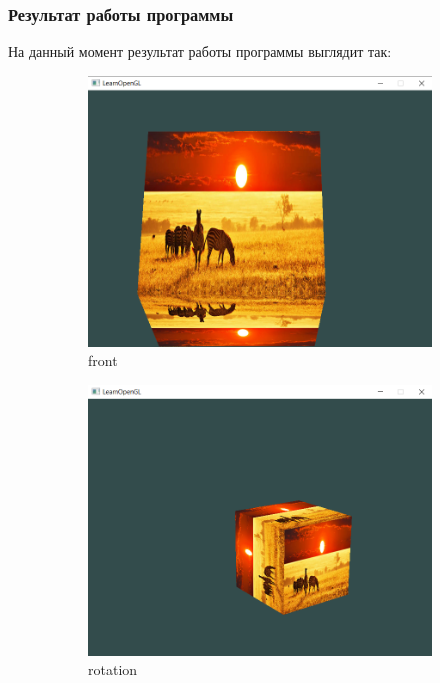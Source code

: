\documentclass[12pt]{article}
\newcounter{subsubsubsection}[subsubsection]
\begin{document}
  \subsubsection{Результат работы программы}
  На данный момент результат работы программы выглядит так:
  \begin{figure}[h]
    \begin{subfigure}{.5\textwidth}
      \centering
      \includegraphics[width=.8\linewidth]{images/res_proj2.png}
      \caption{front}
      \label{fig:sfig1}
    \end{subfigure}%
    \begin{subfigure}{.5\textwidth}
      \centering
      \includegraphics[width=.8\linewidth]{images/res_rotation.png}
      \caption{rotation}
      \label{fig:sfig2}
    \end{subfigure}
    \\
    \begin{subfigure}{.5\textwidth}

\end{subfigure}
\end{figure}
\end{document}
